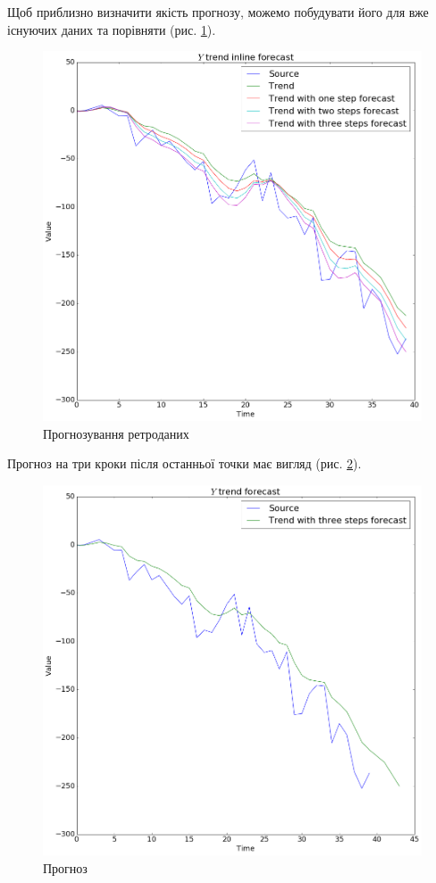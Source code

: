 Щоб приблизно визначити якість прогнозу,
можемо побудувати його для вже існуючих даних та порівняти
(рис. \ref{fig:forecast:initial}).
\begin{figure}[h!]
  \centering
  \includegraphics[width=\textwidth]{Coursework_files/Coursework_41_0.png}
  \caption{Прогнозування ретроданих}
  \label{fig:forecast:initial}
\end{figure}
Прогноз на три кроки після останньої точки має вигляд
(рис. \ref{fig:forecast:y}).
\begin{figure}[h!]
  \centering
  \includegraphics[width=\textwidth]{Coursework_files/Coursework_42_0.png}
  \caption{Прогноз}
  \label{fig:forecast:y}
\end{figure}
